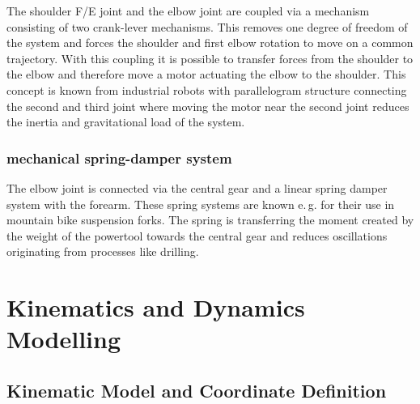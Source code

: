 \documentclass[letterpaper, 10 pt, conference]{ieeeconf}  %
\begin{document}
The shoulder F/E joint and the elbow joint are coupled via a mechanism consisting of two crank-lever mechanisms.
This removes one degree of freedom of the system and forces the shoulder and first elbow rotation to move on a common trajectory.
With this coupling it is possible to transfer forces from the shoulder to the elbow and therefore move a motor actuating the elbow to the shoulder.
This concept is known from industrial robots with parallelogram structure connecting the second and third joint where moving the motor near the second joint reduces the inertia and gravitational load of the system.

\subsubsection{mechanical spring-damper system}

The elbow joint is connected via the central gear and a linear spring damper system with the forearm.
These spring systems are known e.\,g. for their use in mountain bike suspension forks.
The spring is transferring the moment created by the weight of the powertool towards the central gear and reduces oscillations originating from processes like drilling.

\section{Kinematics and Dynamics Modelling}
\label{sec:model}

\subsection{Kinematic Model and Coordinate Definition}
\end{document}
